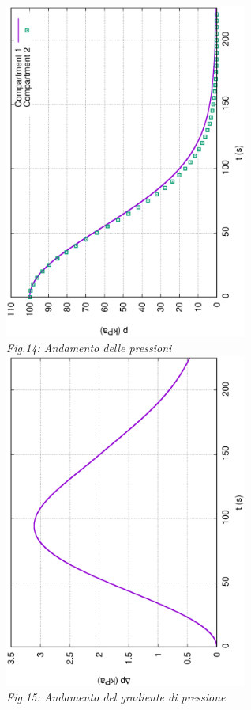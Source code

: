 \documentclass{article}
\begin{document}
        \pagebreak
        \begin{center}
            \includegraphics[width=0.6\textwidth, angle=-90]{MUL2/p_ES2_6.eps}\\ 
            \textit{Fig.14: Andamento delle pressioni} \\ 
            \includegraphics[width=0.6\textwidth, angle=-90]{MUL2/Dp_ES2_6.eps}\\
            \textit{Fig.15: Andamento del gradiente di pressione}\\
        \end{center}
        \pagebreak
\end{document}
